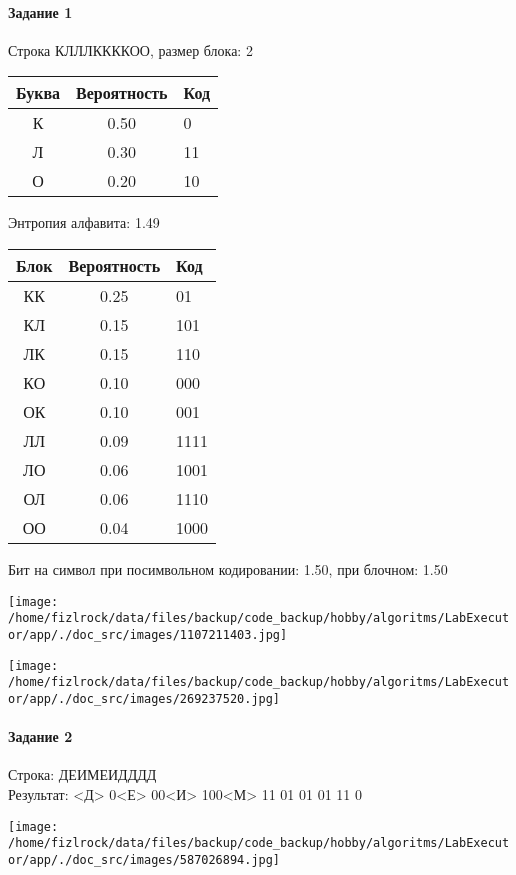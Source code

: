 \documentclass[a4paper, 12pt]{article}
\begin{document}
\paragraph{Задание 1}

Строка КЛЛЛККККОО, размер блока: 2
\begin{center}
 \begin{tabular}{ |c|c|l| } 
  \hline
     Буква & Вероятность & Код\\ \hline
К & 0.50 & 0\\\hline
Л & 0.30 & 11\\\hline
О & 0.20 & 10
\\ \hline \end{tabular}
\end{center}
Энтропия алфавита: 1.49
\begin{center}
 \begin{tabular}{ |c|c|l| } 
  \hline
     Блок & Вероятность & Код\\ \hline
КК & 0.25 & 01\\\hline
КЛ & 0.15 & 101\\\hline
ЛК & 0.15 & 110\\\hline
КО & 0.10 & 000\\\hline
ОК & 0.10 & 001\\\hline
ЛЛ & 0.09 & 1111\\\hline
ЛО & 0.06 & 1001\\\hline
ОЛ & 0.06 & 1110\\\hline
ОО & 0.04 & 1000
\\ \hline \end{tabular}
\end{center}
Бит на символ при посимвольном кодировании: 1.50, при блочном: 1.50

\texttt{[image: /home/fizlrock/data/files/backup/code\_backup/hobby/algoritms/LabExecutor/app/./doc\_src/images/1107211403.jpg]}

\texttt{[image: /home/fizlrock/data/files/backup/code\_backup/hobby/algoritms/LabExecutor/app/./doc\_src/images/269237520.jpg]}
\pagebreak
\paragraph{Задание 2}

Строка: 
ДЕИМЕИДДДД\\
Результат: <Д> 0<Е> 00<И> 100<М> 11 01 01 01 11 0

\texttt{[image: /home/fizlrock/data/files/backup/code\_backup/hobby/algoritms/LabExecutor/app/./doc\_src/images/587026894.jpg]}
\end{document}
